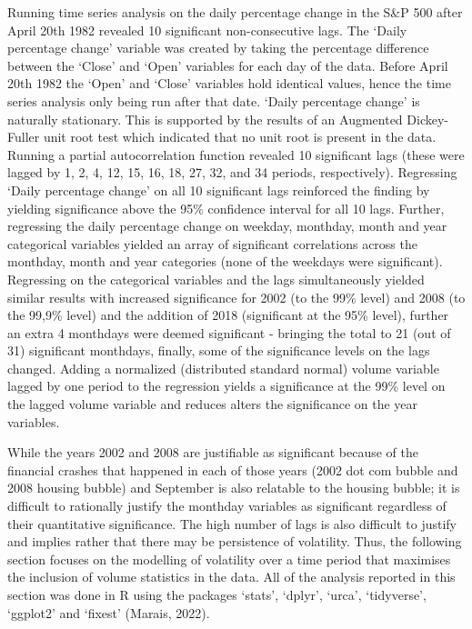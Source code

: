 \documentclass[11pt,preprint, authoryear]{elsarticle}
\numberwithin{equation}{section}
\numberwithin{figure}{section}
\numberwithin{table}{section}
\begin{document}
Running time series analysis on the daily percentage change in the S\&P
500 after April 20th 1982 revealed 10 significant non-consecutive lags.
The `Daily percentage change' variable was created by taking the
percentage difference between the `Close' and `Open' variables for each
day of the data. Before April 20th 1982 the `Open' and `Close' variables
hold identical values, hence the time series analysis only being run
after that date. `Daily percentage change' is naturally stationary. This
is supported by the results of an Augmented Dickey-Fuller unit root test
which indicated that no unit root is present in the data. Running a
partial autocorrelation function revealed 10 significant lags (these
were lagged by 1, 2, 4, 12, 15, 16, 18, 27, 32, and 34 periods,
respectively). Regressing `Daily percentage change' on all 10
significant lags reinforced the finding by yielding significance above
the 95\% confidence interval for all 10 lags. Further, regressing the
daily percentage change on weekday, monthday, month and year categorical
variables yielded an array of significant correlations across the
monthday, month and year categories (none of the weekdays were
significant). Regressing on the categorical variables and the lags
simultaneously yielded similar results with increased significance for
2002 (to the 99\% level) and 2008 (to the 99,9\% level) and the addition
of 2018 (significant at the 95\% level), further an extra 4 monthdays
were deemed significant - bringing the total to 21 (out of 31)
significant monthdays, finally, some of the significance levels on the
lags changed. Adding a normalized (distributed standard normal) volume
variable lagged by one period to the regression yields a significance at
the 99\% level on the lagged volume variable and reduces alters the
significance on the year variables.

While the years 2002 and 2008 are justifiable as significant because of
the financial crashes that happened in each of those years (2002 dot com
bubble and 2008 housing bubble) and September is also relatable to the
housing bubble; it is difficult to rationally justify the monthday
variables as significant regardless of their quantitative significance.
The high number of lags is also difficult to justify and implies rather
that there may be persistence of volatility. Thus, the following section
focuses on the modelling of volatility over a time period that maximises
the inclusion of volume statistics in the data. All of the analysis
reported in this section was done in R using the packages `stats',
`dplyr', `urca', `tidyverse', `ggplot2' and `fixest' (Marais, 2022).
\end{document}
